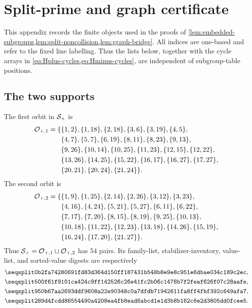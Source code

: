 \section{Split-prime and graph certificate}
\label{app:split-graph}

This appendix records the finite objects used in the proofs of
\cref{lem:embedded-subgroups,lem:split-noncollision,lem:graph-bridge}.  All
indices are one-based and refer to the fixed
line labelling.  Thus the lists below, together with the cycle arrays in
\cref{eq:Hplus-cycles,eq:Hminus-cycles}, are independent of subgroup-table
positions.

\subsection{The two supports}

The first orbit in $\mathcal{S}_+$ is
\begin{equation*}
\begin{aligned}
\mathcal{O}_{+,1}=\{&\{1,2\},\{1,18\},\{2,18\},\{3,6\},\{3,19\},\{4,5\},\\
&\{4,7\},\{5,7\},\{6,19\},\{8,11\},\{8,23\},\{9,13\},\\
&\{9,26\},\{10,14\},\{10,25\},\{11,23\},\{12,15\},\{12,22\},\\
&\{13,26\},\{14,25\},\{15,22\},\{16,17\},\{16,27\},\{17,27\},\\
&\{20,21\},\{20,24\},\{21,24\}\}.
\end{aligned}
\end{equation*}
The second orbit is
\begin{equation*}
\begin{aligned}
\mathcal{O}_{+,2}=\{&\{1,9\},\{1,25\},\{2,14\},\{2,26\},\{3,12\},\{3,23\},\\
&\{4,16\},\{4,24\},\{5,21\},\{5,27\},\{6,11\},\{6,22\},\\
&\{7,17\},\{7,20\},\{8,15\},\{8,19\},\{9,25\},\{10,13\},\\
&\{10,18\},\{11,22\},\{12,23\},\{13,18\},\{14,26\},\{15,19\},\\
&\{16,24\},\{17,20\},\{21,27\}\}.
\end{aligned}
\end{equation*}
Thus $\mathcal{S}_+=\mathcal{O}_{+,1}\sqcup\mathcal{O}_{+,2}$ has $54$ pairs.  Its family-list,
stabilizer-inventory, value-list, and sorted-value digests are respectively
\begin{align*}
&\hexsha{0b2fa74280691fd83d364d150ff187431b548b8e9e8c951e6dbae034c189c2ec},\\
&\hexsha{500f61f9101ca424c9ff142526c26e41fc2b06c1478b7f2feaf626f07c28aafe},\\
&\hexsha{950b67aa2693ddf9608a22e90348c0a7dfdb71942611fa8ff4fbf392c649afa7},\\
&\hexsha{289d4fcdd86554490a4208ea4fb8ead6abcd1e1d3b8b162c6e2d3805dd0fcee5}.
\end{align*}


